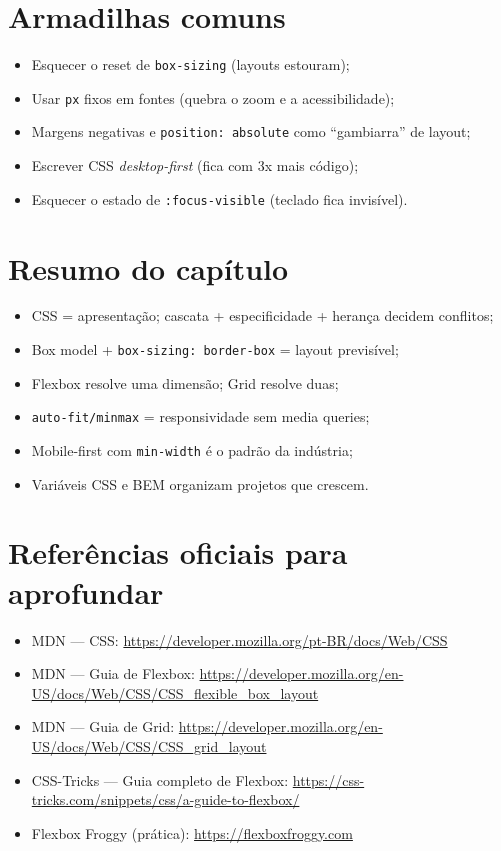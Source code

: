 \section{Armadilhas comuns}

\begin{itemize}[leftmargin=*, itemsep=0.4em]
  \item Esquecer o reset de \texttt{box-sizing} (layouts estouram);
  \item Usar \texttt{px} fixos em fontes (quebra o zoom e a acessibilidade);
  \item Margens negativas e \texttt{position: absolute} como ``gambiarra'' de layout;
  \item Escrever CSS \emph{desktop-first} (fica com 3x mais código);
  \item Esquecer o estado de \texttt{:focus-visible} (teclado fica invisível).
\end{itemize}

\section{Resumo do capítulo}

\begin{itemize}[leftmargin=*, itemsep=0.3em]
  \item CSS = apresentação; cascata + especificidade + herança decidem conflitos;
  \item Box model + \texttt{box-sizing: border-box} = layout previsível;
  \item Flexbox resolve uma dimensão; Grid resolve duas;
  \item \texttt{auto-fit/minmax} = responsividade sem media queries;
  \item Mobile-first com \texttt{min-width} é o padrão da indústria;
  \item Variáveis CSS e BEM organizam projetos que crescem.
\end{itemize}

\section{Referências oficiais para aprofundar}

\begin{itemize}[leftmargin=*, itemsep=0.3em]
  \item MDN — CSS: \url{https://developer.mozilla.org/pt-BR/docs/Web/CSS}
  \item MDN — Guia de Flexbox: \url{https://developer.mozilla.org/en-US/docs/Web/CSS/CSS_flexible_box_layout}
  \item MDN — Guia de Grid: \url{https://developer.mozilla.org/en-US/docs/Web/CSS/CSS_grid_layout}
  \item CSS-Tricks — Guia completo de Flexbox: \url{https://css-tricks.com/snippets/css/a-guide-to-flexbox/}
  \item Flexbox Froggy (prática): \url{https://flexboxfroggy.com}
\end{itemize}
